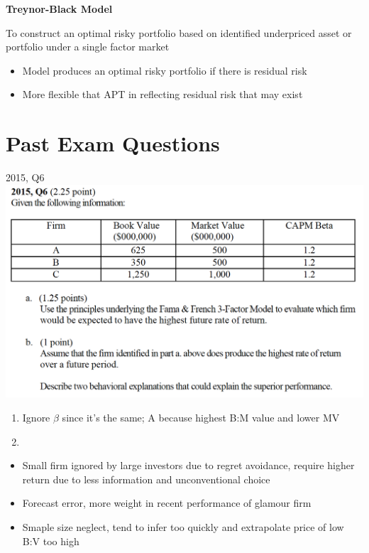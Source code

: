 \documentclass[]{book}
\providecommand{\tightlist}{%
  \setlength{\itemsep}{0pt}\setlength{\parskip}{0pt}}
\theoremstyle{definition}
\theoremstyle{definition}
\theoremstyle{remark}
\begin{document}
 \textbf{Treynor-Black Model}

To construct an optimal risky portfolio based on identified underpriced
asset or portfolio under a single factor market

\begin{itemize}
\item
  Model produces an optimal risky portfolio if there is residual risk
\item
  More flexible that APT in reflecting residual risk that may exist
\end{itemize}

\section{Past Exam Questions}\label{past-exam-questions-4}

 2015, Q6 \includegraphics{questions/2015-6Q.png}

\begin{enumerate}
\def\labelenumi{\alph{enumi}.}
\item
  Ignore \(\beta\) since it's the same; A because highest B:M value and
  lower MV
\item
\end{enumerate}

\begin{itemize}
\tightlist
\item
  Small firm ignored by large investors due to regret avoidance, require
  higher return due to less information and unconventional choice
\item
  Forecast error, more weight in recent performance of glamour firm
\item
  Smaple size neglect, tend to infer too quickly and extrapolate price
  of low B:V too high
\end{itemize}
\end{document}
